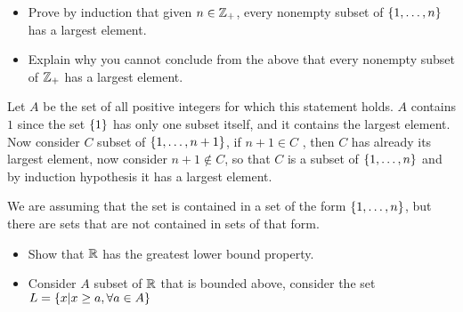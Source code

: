 \begin{exc}
	\begin{itemize}
		\item Prove by induction that given $ n \in \mathbb{Z}_+$, every nonempty subset of $ \left\lbrace 1, \ldots, n \right\rbrace $ has a largest element.
		\item Explain why you cannot conclude from the above that every nonempty subset of $ \mathbb{Z}_+ $ has a largest element.
		
	\end{itemize}
\end{exc}
\begin{sol}
	\item Let $ A $ be the set of all positive integers for which this statement holds. $ A $ contains $ 1 $ since the set $ \left\lbrace 1 \right\rbrace $ has only one subset itself, and it contains the largest element. Now consider $ C $ subset of $ \left\lbrace 1, \ldots, n+1 \right\rbrace $, if $ n+1 \in C $ , then $ C $ has already its largest element, now consider $ n + 1 \notin C$, so that $ C $ is a subset of $ \left\lbrace 1,\ldots,n \right\rbrace $ and by induction hypothesis it has a largest element.
	\item We are assuming that the set is contained in a set of the form $ \left\lbrace 1, \ldots, n \right\rbrace $, but there are sets that are not contained in sets of that form.
\end{sol}
\begin{exc}
	\begin{itemize}
		\item Show that $ \mathbb{R} $ has the greatest lower bound property.
	\end{itemize}
\end{exc}
\begin{sol}
	\begin{itemize}
		\item Consider $ A $ subset of $ \mathbb{R} $ that is bounded above, consider the set $ L = \left\lbrace x | x \geq a, \forall a \in A \right\rbrace $
	\end{itemize}
\end{sol}